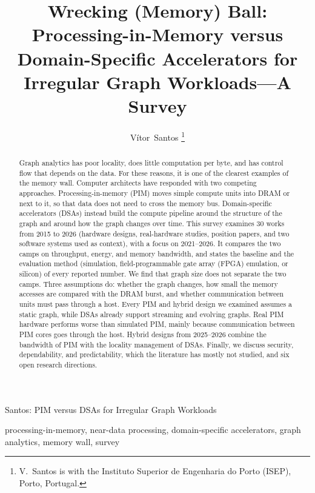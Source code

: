 \documentclass[journal,onecolumn]{IEEEtran}
\begin{document}
\title{Wrecking (Memory) Ball: Processing-in-Memory versus Domain-Specific Accelerators for Irregular Graph Workloads---A Survey}

\author{Vítor~Santos%
\thanks{V.~Santos is with the Instituto Superior de Engenharia do Porto (ISEP), Porto, Portugal.}}

%
{Santos: PIM versus DSAs for Irregular Graph Workloads}

\maketitle

\begin{abstract}
Graph analytics has poor locality, does little computation per byte, and has control flow that depends on the data. For these reasons, it is one of the clearest examples of the memory wall. Computer architects have responded with two competing approaches. Processing-in-memory (PIM) moves simple compute units into DRAM or next to it, so that data does not need to cross the memory bus. Domain-specific accelerators (DSAs) instead build the compute pipeline around the structure of the graph and around how the graph changes over time. This survey examines 30 works from 2015 to 2026 (hardware designs, real-hardware studies, position papers, and two software systems used as context), with a focus on 2021--2026. It compares the two camps on throughput, energy, and memory bandwidth, and states the baseline and the evaluation method (simulation, field-programmable gate array (FPGA) emulation, or silicon) of every reported number. We find that graph size does not separate the two camps. Three assumptions do: whether the graph changes, how small the memory accesses are compared with the DRAM burst, and whether communication between units must pass through a host. Every PIM and hybrid design we examined assumes a static graph, while DSAs already support streaming and evolving graphs. Real PIM hardware performs worse than simulated PIM, mainly because communication between PIM cores goes through the host. Hybrid designs from 2025--2026 combine the bandwidth of PIM with the locality management of DSAs. Finally, we discuss security, dependability, and predictability, which the literature has mostly not studied, and six open research directions.
\end{abstract}

\begin{IEEEkeywords}
processing-in-memory, near-data processing, domain-specific accelerators, graph analytics, memory wall, survey
\end{IEEEkeywords}
\end{document}
